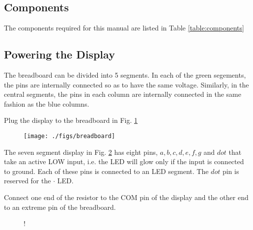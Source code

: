 \subsection{Components}
The components required for this manual are listed in Table \ref{table:components}

\subsection{Powering the Display}
The breadboard can be divided into 5 segments.  In each of the green segements, the pins are internally connected so as to have the same voltage.  Similarly, in the central segments, the pins in each column  are internally connected in the same fashion as the blue columns. 

\begin{problem}
	Plug the display to the breadboard in Fig. \ref{fig:breadboard}
\end{problem}
\begin{figure}[!h]
\begin{center}
\texttt{[image: ./figs/breadboard]}
\end{center}
\caption{}
\label{fig:breadboard}
\end{figure}

The seven segment display in Fig. \ref{fig:sevenseg} has eight pins, $a, b, c, d, e, f, g$ and $dot$ that take an active LOW input, i.e.  the LED will glow only if the input is connected to ground.  Each of these pins is connected to an LED segment.  The $dot$ pin is  reserved for the $\cdot$ LED.  

%

\begin{problem}
	Connect one end of the resistor to the COM pin of the display and the other end to an extreme pin of the breadboard.	
\end{problem}
%
%
\begin{figure}[!h]
\begin{center}
\resizebox {0.5\columnwidth} {!} {

}
\end{center}
\caption{}
\label{fig:sevenseg}
\end{figure}

